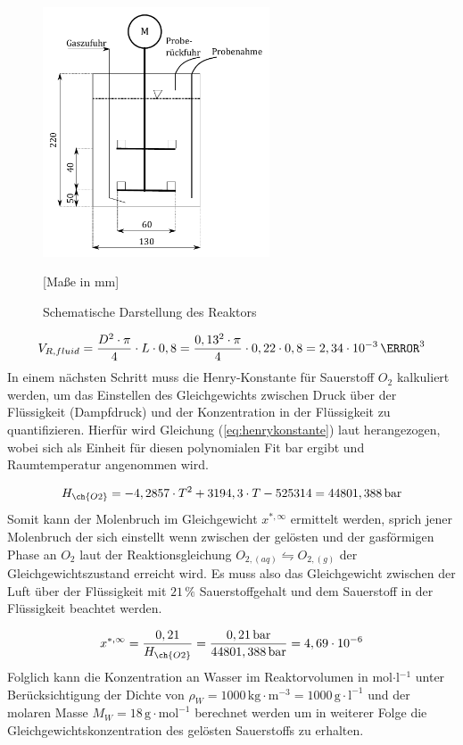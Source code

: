 \documentclass[12pt,liststotoc]{report}
\begin{document}
\begin{figure}[H]
\centering
\includegraphics[width=0.6\textwidth]{Graphics/SkizzeReaktor.pdf}
\caption{Schematische Darstellung des Reaktors}[Maße in mm]
\label{fig:masseReactor}
\end{figure}
\noindent

\begin{equation}
 V_{R,fluid} = \frac{D^2 \cdot \pi}{4} \cdot L \cdot 0,8 = \frac{0,13^2 \cdot \pi}{4} \cdot 0,22 \cdot 0,8 = 2,34 \cdot 10^{-3}\,\m^3  
\end{equation}
\noindent
In einem nächsten Schritt muss die Henry-Konstante für Sauerstoff $O_2$ kalkuliert werden, um das Einstellen des Gleichgewichts zwischen Druck über der Flüssigkeit (Dampfdruck) und der Konzentration in der Flüssigkeit zu quantifizieren. Hierfür wird Gleichung (\ref{eq:henrykonstante}) laut \cite{Labor_Skript} herangezogen, wobei sich als Einheit für diesen polynomialen Fit bar ergibt und Raumtemperatur angenommen wird.

\begin{equation}
\label{eq:henrykonstante}
 H_{\ch{O2}} = -4,2857 \cdot T^2 + 3194,3 \cdot T - 525314 = 44801,388\,\text{bar}
\end{equation}
\noindent
Somit kann der Molenbruch im Gleichgewicht $x^{*,\infty}$ ermittelt werden, sprich jener Molenbruch der sich einstellt wenn zwischen der gelösten und der gasförmigen Phase an $O_2$ laut der Reaktionsgleichung $O_{2,(aq)} \leftrightharpoons O_{2, (g)}$ der Gleichgewichtszustand erreicht wird. Es muss also das Gleichgewicht zwischen der Luft über der Flüssigkeit mit $21\,\%$ Sauerstoffgehalt und dem Sauerstoff in der Flüssigkeit beachtet werden.

\begin{equation}
    x^{*,\infty} = \frac{0,21}{H_{\ch{O2}}} = \frac{0,21\,\text{bar}}{44801,388\,\text{bar}} = 4,69 \cdot 10^{-6}
\end{equation}
\noindent
Folglich kann die Konzentration an Wasser im Reaktorvolumen in mol$\cdot$l$^{-1}$ unter Berücksichtigung der Dichte von $\rho_{W} = 1000\,\text{kg}\cdot \text{m}^{-3} = 1000\,\text{g}\cdot \text{l}^{-1}$ und der molaren Masse $M_W = 18$\,$\text{g}\cdot \text{mol}^{-1}$ berechnet werden um in weiterer Folge die Gleichgewichtskonzentration des gelösten Sauerstoffs zu erhalten.
\end{document}
